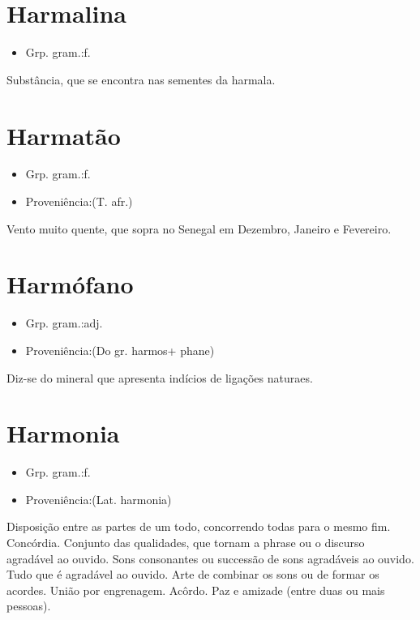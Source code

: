 \documentclass{article}
\begin{document}
\section{Harmalina}
\begin{itemize}
\item {Grp. gram.:f.}
\end{itemize}
Substância, que se encontra nas sementes da harmala.
\section{Harmatão}
\begin{itemize}
\item {Grp. gram.:f.}
\end{itemize}
\begin{itemize}
\item {Proveniência:(T. afr.)}
\end{itemize}
Vento muito quente, que sopra no Senegal em Dezembro, Janeiro e Fevereiro.
\section{Harmófano}
\begin{itemize}
\item {Grp. gram.:adj.}
\end{itemize}
\begin{itemize}
\item {Proveniência:(Do gr. \textunderscore harmos\textunderscore  + \textunderscore phane\textunderscore )}
\end{itemize}
Diz-se do mineral que apresenta indícios de ligações naturaes.
\section{Harmonia}
\begin{itemize}
\item {Grp. gram.:f.}
\end{itemize}
\begin{itemize}
\item {Proveniência:(Lat. \textunderscore harmonia\textunderscore )}
\end{itemize}
Disposição entre as partes de um todo, concorrendo todas para o mesmo fim.
Concórdia.
Conjunto das qualidades, que tornam a phrase ou o discurso agradável ao ouvido.
Sons consonantes ou successão de sons agradáveis ao ouvido.
Tudo que é agradável ao ouvido.
Arte de combinar os sons ou de formar os acordes.
União por engrenagem.
Acôrdo.
Paz e amizade (entre duas ou mais pessoas).
\end{document}
